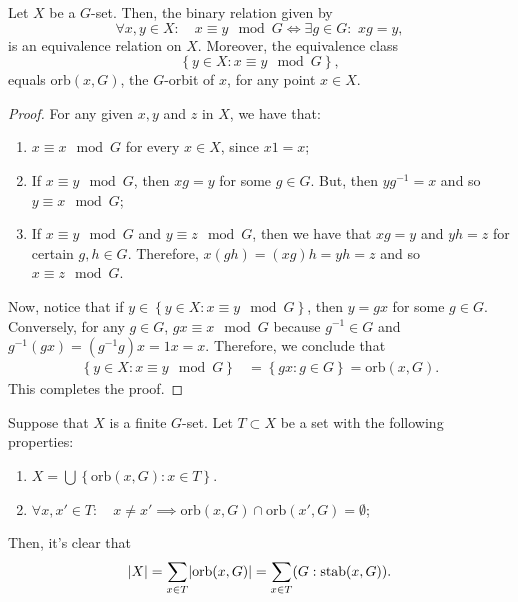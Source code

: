\begin{proposition}\label{prop:orbit-decomposition-of-g-sets}
  Let \(X\) be a \(G\)-set. Then, the binary relation given by
  \begin{equation}\label{eq:g-equivalent-points}
    \forall{x,y\in{X}}:
    \quad
    x\equiv{y}\mod{G}
    \iff
    \exists{g\in{G}}:
    \,\,
    xg=y,
  \end{equation}
  is an equivalence relation on \(X\). Moreover, the equivalence class
  \[
    \left\{y\in{X}:x\equiv{y}\mod{G}\right\},
  \]
  equals \(\text{orb}(x,G)\), the \(G\)-orbit of \(x\), for any point \(x\in{X}\).
\end{proposition}

\begin{proof}
  For any given \(x,y\) and \(z\) in \(X\), we have that:
  \begin{enumerate}
    \item
      \(x\equiv{x}\mod{G}\) for every \(x\in{X}\), since \(x1=x\);
    \item
      If \(x\equiv{y}\mod{G}\), then \(xg=y\) for some \(g\in{G}\). But, then
      \(yg^{-1}=x\) and so \(y\equiv{x}\mod{G}\);
    \item
      If \(x\equiv{y}\mod{G}\) and \(y\equiv{z}\mod{G}\), then we have that
      \(xg=y\) and \(yh=z\) for certain \(g,h\in{G}\). Therefore,
      \(x(gh)=(xg)h=yh=z\) and so \(x\equiv{z}\mod{G}\).
  \end{enumerate}
  Now, notice that if \(y\in\left\{y\in{X}:x\equiv{y}\mod{G}\right\}\), then
  \(y=gx\) for some \(g\in{G}\). Conversely, for any \(g\in{G}\),
  \(gx\equiv{x}\mod{G}\) because \(g^{-1}\in{G}\) and
  \(g^{-1}(gx)=(g^{-1}g)x=1x=x\). Therefore, we conclude that
  \begin{align*}
    \left\{y\in{X}:x\equiv{y}\mod{G}\right\}
    &=
    \left\{gx:g\in{G}\right\}
    =\text{orb}(x,G).
  \end{align*}
  This completes the proof.
\end{proof}

Suppose that \(X\) is a finite \(G\)-set. Let \(T\subset{X}\) be a set with the
following properties:
\begin{enumerate}
  \item
    \(X=\bigcup\left\{\text{orb}(x,G):x\in{T}\right\}\).
  \item
    \(\forall{x,x'\in{T}}:\quad{x\neq{x'}}\implies{\text{orb}(x,G)\cap{\text{orb}(x',G)}}=\emptyset\);
\end{enumerate}
Then, it's clear that
\begin{equation}\label{eq:numeric-characteristic}
  \lvert X\rvert=\sum\limits_{x\in{T}}\lvert\text{orb}(x,G)\rvert=\sum\limits_{x\in{T}}(G:\text{stab}(x,G)).
\end{equation}

